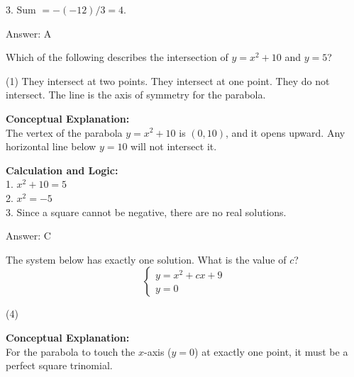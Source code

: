 \documentclass[11pt,paper=a4,answers]{exam}
\begin{document}
\begin{questions}
\begin{solution}
\vspace{10pt}

3. Sum $= -(-12)/3 = 4$.

\vspace{25pt}

Answer: \colorbox{yellow!100}{A}
\end{solution}

\vspace{40pt}

\question
Which of the following describes the intersection of $y = x^2 + 10$ and $y = 5$?
\begin{tasks}(1)
    \task They intersect at two points.
    \task They intersect at one point.
    \task They do not intersect.
    \task The line is the axis of symmetry for the parabola.
\end{tasks}

\begin{solution}
\textbf{Conceptual Explanation:} \\
The vertex of the parabola $y = x^2 + 10$ is $(0, 10)$, and it opens upward. Any horizontal line below $y = 10$ will not intersect it.

\vspace{20pt}

\textbf{Calculation and Logic:} \\
1. $x^2 + 10 = 5$ \\
2. $x^2 = -5$ \\
3. Since a square cannot be negative, there are no real solutions.

\vspace{25pt}

Answer: \colorbox{yellow!100}{C}
\end{solution}

\vspace{40pt}

\question
The system below has exactly one solution. What is the value of $c$?
\[ \begin{cases} y = x^2 + cx + 9 \\ y = 0 \end{cases} \]
\begin{tasks}(4)
\end{tasks}

\begin{solution}
\textbf{Conceptual Explanation:} \\
For the parabola to touch the $x$-axis ($y = 0$) at exactly one point, it must be a perfect square trinomial.


\end{solution}
\end{questions}
\end{document}
